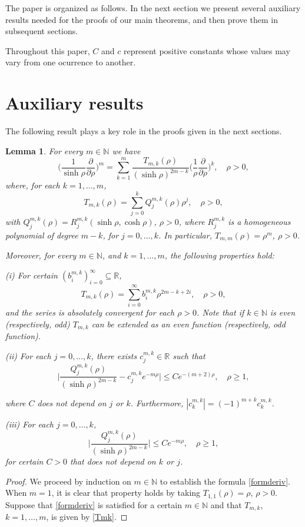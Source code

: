 \documentclass[a4paper,10pt, reqno]{amsart}
\newtheorem{lem}[thm]{Lemma}
\theoremstyle{definition}
\theoremstyle{remark}
\numberwithin{equation}{section}
\begin{document}
{The paper is organized as follows. In the next section we present several auxiliary results needed for the proofs of our main theorems, and then prove them in subsequent sections.


Throughout this paper, $C$ and $c$ represent positive constants whose values may vary from one ocurrence to another.

\section{Auxiliary results}\label{S2}


The following result plays a key role in the proofs given in the next sections.

\begin{lem}\label{key}
For every $m\in \mathbb N$ we have 
\begin{equation}\label{formderiv}
\Big(\frac{1}{\sinh \rho }\frac{\partial }{\partial\rho }\Big)^m=\sum_{k=1}^m\frac{T_{m,k}(\rho )}{(\sinh \rho)^{2m-k}}\Big(\frac{1}{\rho }\frac{\partial }{\partial\rho }\Big)^k,\quad \rho >0,
\end{equation}
where, for each $k=1,\ldots, m$, 
\begin{equation}\label{Tmk}
T_{m,k}(\rho )=\sum_{j=0}^k Q_j^{m,k}(\rho )\rho ^j,\quad \rho >0,
\end{equation}
with $Q_j^{m,k}(\rho )=R_j^{m,k}(\sinh \rho ,\cosh \rho)$, $\rho >0$, where $R_j^{m,k}$ is a homogeneous polynomial of degree $m-k$, for $j=0,\ldots , k$. In particular, $T_{m,m}(\rho )=\rho  ^m$, $\rho >0$.

Moreover, for every $m\in \mathbb N$, and $k=1,\ldots, m$, the following properties hold:

(i) For certain $(b_i^{m,k})_{i=0}^\infty\subseteq \mathbb R$, 
$$
T_{m,k}(\rho )=\sum_{i=0}^\infty b_i^{m,k}\rho ^{2m-k+2i},\quad \rho >0,
$$
and the series is absolutely convergent for each $\rho >0$. Note that if $k\in \mathbb N$ is even (respectively, odd) $T_{m,k}$ can be extended as an even function (respectively, odd function).

(ii) For each $j=0,\ldots,k$, there exists $c_j^{m,k}\in \mathbb R$ such that
$$
\Big|\frac{Q_j^{m,k}(\rho )}{(\sinh \rho )^{2m-k}}-c_j^{m,k}e^{-m\rho }\Big|\leq Ce^{-(m+2)\rho},\quad \rho \geq 1,
$$

where $C$ does not depend on $j$ or $k$. Furthermore, $|c_k^{m,k}|=(-1)^{m+k}c_k^{m,k}$.

(iii) For each $j=0,\ldots,k$, 
$$
\Big|\frac{Q_j^{m,k}(\rho )}{(\sinh \rho )^{2m-k}}\Big|\leq Ce^{-m\rho },\quad \rho \geq 1,
$$
for certain $C>0$ that does not depend on $k$ or $j$.
\end{lem}
\begin{proof}
We proceed by induction on $m\in \mathbb N$ to establish the formula \eqref{formderiv}. When $m=1$, it is clear that property holds by taking $T_{1,1}(\rho )=\rho $, $\rho >0$.
Suppose that \eqref{formderiv} is satisfied for a certain $m\in \mathbb N$ and that $T_{m,k}$, $k=1,\ldots, m$, is given by \eqref{Tmk}.


\end{proof}}
\end{document}
